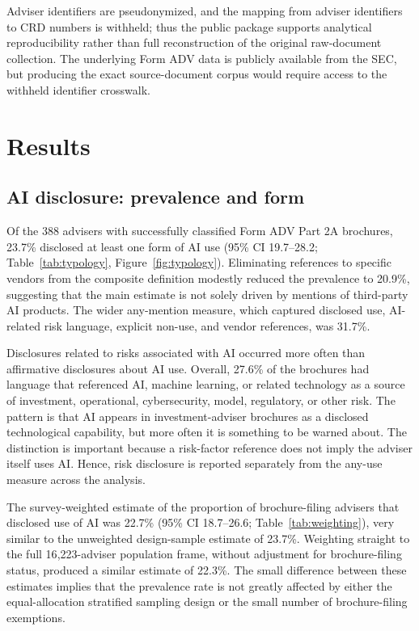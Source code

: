 \documentclass[utf8]{FrontiersinHarvard}
\begin{document}
Adviser identifiers are pseudonymized, and the mapping from adviser identifiers to CRD numbers is withheld; thus the public package supports analytical reproducibility rather than full reconstruction of the original raw-document collection. The underlying Form ADV data is publicly available from the SEC, but producing the exact source-document corpus would require access to the withheld identifier crosswalk.

\section{Results}

\subsection{AI disclosure: prevalence and form}

Of the 388 advisers with successfully classified Form ADV Part 2A brochures, 23.7\% disclosed at least one form of AI use (95\% CI 19.7--28.2; Table~\ref{tab:typology}, Figure~\ref{fig:typology}). Eliminating references to specific vendors from the composite definition modestly reduced the prevalence to 20.9\%, suggesting that the main estimate is not solely driven by mentions of third-party AI products. The wider any-mention measure, which captured disclosed use, AI-related risk language, explicit non-use, and vendor references, was 31.7\%.

Disclosures related to risks associated with AI occurred more often than affirmative disclosures about AI use. Overall, 27.6\% of the brochures had language that referenced AI, machine learning, or related technology as a source of investment, operational, cybersecurity, model, regulatory, or other risk. The pattern is that AI appears in investment-adviser brochures as a disclosed technological capability, but more often it is something to be warned about. The distinction is important because a risk-factor reference does not imply the adviser itself uses AI. Hence, risk disclosure is reported separately from the any-use measure across the analysis.

The survey-weighted estimate of the proportion of brochure-filing advisers that disclosed use of AI was 22.7\% (95\% CI 18.7--26.6; Table~\ref{tab:weighting}), very similar to the unweighted design-sample estimate of 23.7\%. Weighting straight to the full 16{,}223-adviser population frame, without adjustment for brochure-filing status, produced a similar estimate of 22.3\%. The small difference between these estimates implies that the prevalence rate is not greatly affected by either the equal-allocation stratified sampling design or the small number of brochure-filing exemptions.
\end{document}
